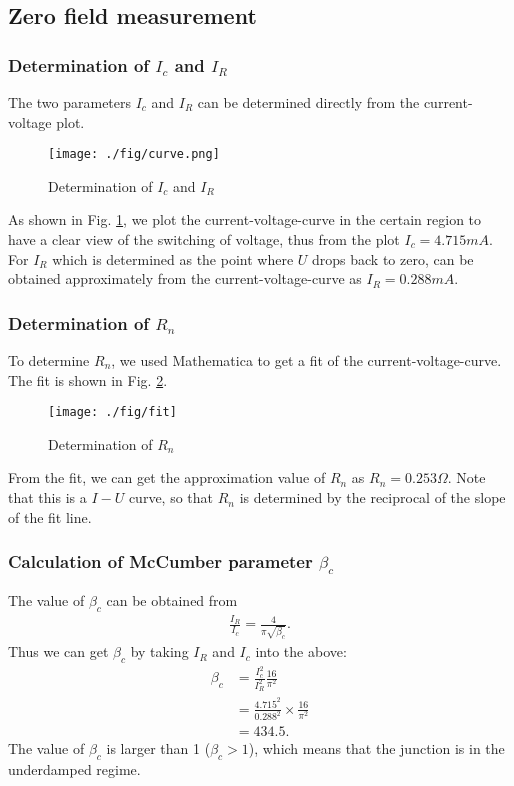 \subsection{Zero field measurement}

\subsubsection{Determination of $I_{c}$ and $I_{R}$}
The two parameters $I_{c}$ and $I_{R}$ can be determined directly from the current-voltage plot.


\begin{figure}[h]
\centering
\texttt{[image: ./fig/curve.png]}
\caption{Determination of $I_{c}$ and $I_{R}$}
\label{UIcurvePicture}
\end{figure}


As shown in Fig. \ref{UIcurvePicture}, we plot the current-voltage-curve in the certain region to have a clear view of the switching of voltage,
thus from the plot $I_{c}=4.715mA$. For $I_{R}$ which is determined as the point where $U$ drops back to zero, can be obtained approximately from the current-voltage-curve as $I_R=0.288mA$.
\subsubsection{Determination of $R_{n}$}
To determine $R_{n}$, we used Mathematica to get a fit of the current-voltage-curve. The fit is shown in Fig. \ref{determinationRNfigure}.

\begin{figure}[h]
\centering
\texttt{[image: ./fig/fit]}
\caption{Determination of $R_{n}$}
\label{determinationRNfigure}
\end{figure}


From the fit, we can get the approximation value of $R_{n}$ as $R_{n}=0.253\Omega$. Note that this is a $I-U$ curve, so that $R_{n}$ is determined by the reciprocal of the slope of the fit line.

\subsubsection{Calculation of McCumber parameter $\beta_{c}$}
The value of $\beta_{c}$ can be obtained from
\begin{align*}
\frac{I_{R}}{I_{c}}=\frac{4}{\pi\sqrt{\beta_{c}}}.
\end{align*}
Thus we can get $\beta_{c}$ by taking $I_{R}$ and $I_{c}$ into the above:
\begin{align*}
\beta_c & =\frac{I_{c}^2}{I_{R}^2}\frac{16}{\pi^2}\\
    & =\frac{4.715^2}{0.288^2}\times\frac{16}{\pi^2}\\
    & =434.5.
\end{align*}
The value of $\beta_c$ is larger than 1 ($\beta_{c}>1$), which means that the junction is in the underdamped regime.

